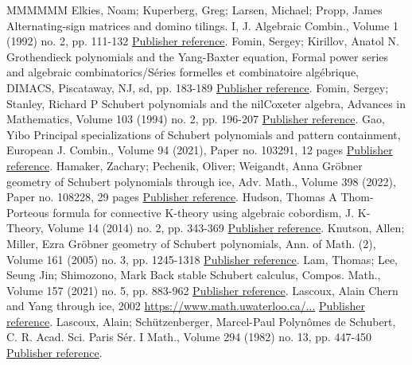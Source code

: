\begin{thebibliography}{MMMMMM}
 Elkies, Noam; Kuperberg, Greg; Larsen, Michael; Propp, James Alternating-sign matrices and domino tilings. I, J. Algebraic Combin., Volume 1 (1992) no. 2, pp. 111-132 \href{https://alco.centre-mersenne.org/articles/10.5802/alco.422/#EKLP92}{Publisher reference}.
 Fomin, Sergey; Kirillov, Anatol N. Grothendieck polynomials and the Yang-Baxter equation, Formal power series and algebraic combinatorics/Séries formelles et combinatoire algébrique, DIMACS, Piscataway, NJ, sd, pp. 183-189 \href{https://alco.centre-mersenne.org/articles/10.5802/alco.422/#FK94}{Publisher reference}.
 Fomin, Sergey; Stanley, Richard P Schubert polynomials and the nilCoxeter algebra, Advances in Mathematics, Volume 103 (1994) no. 2, pp. 196-207 \href{https://alco.centre-mersenne.org/articles/10.5802/alco.422/#FS94}{Publisher reference}.
 Gao, Yibo Principal specializations of Schubert polynomials and pattern containment, European J. Combin., Volume 94 (2021), Paper no. 103291, 12 pages \href{https://alco.centre-mersenne.org/articles/10.5802/alco.422/#Gao21}{Publisher reference}.
 Hamaker, Zachary; Pechenik, Oliver; Weigandt, Anna Gröbner geometry of Schubert polynomials through ice, Adv. Math., Volume 398 (2022), Paper no. 108228, 29 pages \href{https://alco.centre-mersenne.org/articles/10.5802/alco.422/#HPS22}{Publisher reference}.
 Hudson, Thomas A Thom-Porteous formula for connective K-theory using algebraic cobordism, J. K-Theory, Volume 14 (2014) no. 2, pp. 343-369 \href{https://alco.centre-mersenne.org/articles/10.5802/alco.422/#Hud14}{Publisher reference}.
 Knutson, Allen; Miller, Ezra Gröbner geometry of Schubert polynomials, Ann. of Math. (2), Volume 161 (2005) no. 3, pp. 1245-1318 \href{https://alco.centre-mersenne.org/articles/10.5802/alco.422/#KM05}{Publisher reference}.
 Lam, Thomas; Lee, Seung Jin; Shimozono, Mark Back stable Schubert calculus, Compos. Math., Volume 157 (2021) no. 5, pp. 883-962 \href{https://alco.centre-mersenne.org/articles/10.5802/alco.422/#LLS21}{Publisher reference}.
 Lascoux, Alain Chern and Yang through ice, 2002 \url{https://www.math.uwaterloo.ca/...} \href{https://alco.centre-mersenne.org/articles/10.5802/alco.422/#Las02}{Publisher reference}.
 Lascoux, Alain; Schützenberger, Marcel-Paul Polynômes de Schubert, C. R. Acad. Sci. Paris Sér. I Math., Volume 294 (1982) no. 13, pp. 447-450 \href{https://alco.centre-mersenne.org/articles/10.5802/alco.422/#LS82a}{Publisher reference}.

\end{thebibliography}
